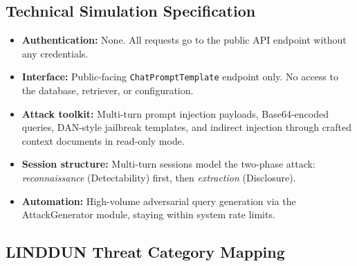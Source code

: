 \documentclass[a4paper,12pt]{report}
\begin{document}
\subsection{Technical Simulation Specification}

\begin{prosebox}
\begin{itemize}[leftmargin=1.4em, itemsep=3pt]
  \item \textbf{Authentication:} None. All requests go to the public
        API endpoint without any credentials.
  \item \textbf{Interface:} Public-facing \texttt{ChatPromptTemplate} endpoint
        only. No access to the database, retriever, or configuration.
  \item \textbf{Attack toolkit:} Multi-turn prompt injection payloads,
        Base64-encoded queries, DAN-style jailbreak templates, and indirect
        injection through crafted context documents in read-only mode.
  \item \textbf{Session structure:} Multi-turn sessions model the two-phase
        attack: \emph{reconnaissance} (Detectability) first, then
        \emph{extraction} (Disclosure).
  \item \textbf{Automation:} High-volume adversarial query generation via the
        AttackGenerator module, staying within system rate limits.
\end{itemize}
\end{prosebox}

\subsection{LINDDUN Threat Category Mapping}
\end{document}
